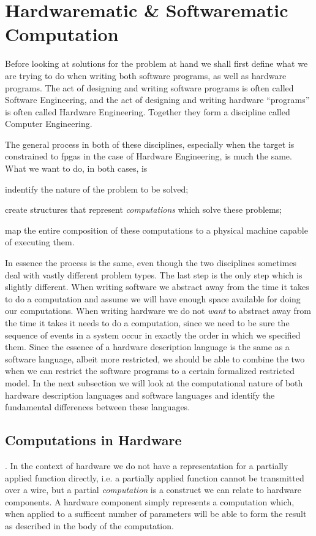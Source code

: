 \section{Hardwarematic \& Softwarematic Computation}
Before looking at solutions for the problem at hand we shall first define what we are trying to do when writing both software programs, as well as hardware programs.
The act of designing and writing software programs is often called Software Engineering, and the act of designing and writing hardware ``programs'' is often called Hardware Engineering. 
Together they form a discipline called Computer Engineering.

The general process in both of these disciplines, especially when the target is constrained to \glspl{fpga} in the case of Hardware Engineering, is much the same. 
What we want to do, in both cases, is  
\begin{inparaenum}
\item indentify the nature of the problem to be solved;
\item create structures that represent \textit{computations} which solve these problems;
\item map the entire composition of these computations to a physical machine capable of executing them.
\end{inparaenum}

In essence the process is the same, even though the two disciplines sometimes deal with vastly different problem types.
The last step is the only step which is slightly different.
When writing software we abstract away from the time it takes to do a computation and assume we will have enough space available for doing our computations.
When writing hardware we do not \textit{want} to abstract away from the time it takes it needs to do a computation, since we need to be sure the sequence of events in a system occur in exactly the order in which we specified them.
Since the essence of a hardware description language is the same as a software language, albeit more restricted, we should be able to combine the two when we can restrict the software programs to a certain formalized restricted model.
In the next subsection we will look at the computational nature of both hardware description languages and software languages and identify the fundamental differences between these languages.

\subsection{Computations in Hardware}
.
In the context of hardware we do not have a representation for a partially applied function directly, i.e. a partially applied function cannot be transmitted over a wire, but a partial \textit{computation} is a construct we can relate to hardware components.
A hardware component simply represents a computation which, when applied to a sufficent number of parameters will be able to form the result as described in the body of the computation.

